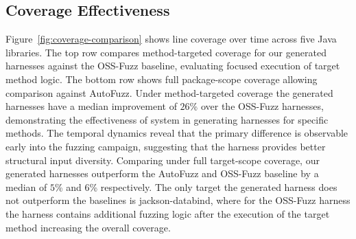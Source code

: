 \subsection{Coverage Effectiveness}%
\label{subsec:coverage-effectiveness}



Figure~\ref{fig:coverage-comparison} shows line coverage over time across five Java libraries. The top row compares method-targeted coverage for our generated harnesses against the OSS-Fuzz baseline, evaluating focused execution of target method logic. The bottom row shows full package-scope coverage allowing comparison against AutoFuzz.
Under method-targeted coverage the generated harnesses have a median improvement of $26$\% over the OSS-Fuzz harnesses, demonstrating the effectiveness of system in generating harnesses for specific methods. The temporal dynamics reveal that the primary difference is observable early into the fuzzing campaign, suggesting that the harness provides better structural input diversity.
Comparing under full target-scope coverage, our generated harnesses outperform the AutoFuzz and OSS-Fuzz baseline by a median of $5$\% and $6$\% respectively. The only target the generated harness does not outperform the baselines is jackson-databind, where for the OSS-Fuzz harness the harness contains additional fuzzing logic after the execution of the target method increasing the overall coverage. 
%
%
